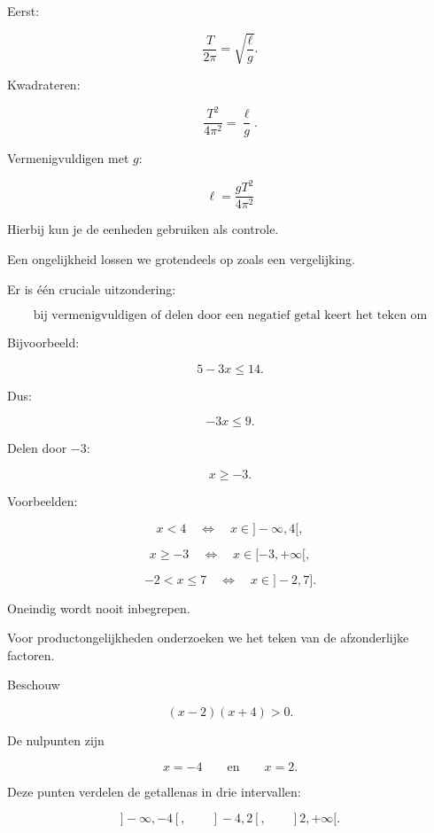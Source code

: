 \documentclass{ximera}
\begin{document}
Eerst:

\[
\frac{T}{2\pi}
=
\sqrt{\frac{\ell}{g}}.
\]

Kwadrateren:

\[
\frac{T^2}{4\pi^2}
=
\frac{\ell}{g}.
\]

Vermenigvuldigen met \(g\):

\[
\boxed{
\ell=\frac{gT^2}{4\pi^2}
}
\]

Hierbij kun je de eenheden gebruiken als controle.




Een ongelijkheid lossen we grotendeels op zoals een vergelijking.

Er is één cruciale uitzondering:

\[
\boxed{
\text{bij vermenigvuldigen of delen door een negatief getal keert het teken om}
}
\]

Bijvoorbeeld:

\[
5-3x\leq14.
\]

Dus:

\[
-3x\leq9.
\]

Delen door \(-3\):

\[
x\geq-3.
\]



Voorbeelden:

\[
x<4
\quad\Longleftrightarrow\quad
x\in]-\infty,4[,
\]

\[
x\geq-3
\quad\Longleftrightarrow\quad
x\in[-3,+\infty[,
\]

\[
-2<x\leq7
\quad\Longleftrightarrow\quad
x\in]-2,7].
\]

Oneindig wordt nooit inbegrepen.



Voor productongelijkheden onderzoeken we het teken van de afzonderlijke factoren.

Beschouw

\[
(x-2)(x+4)>0.
\]

De nulpunten zijn

\[
x=-4
\qquad\text{en}\qquad
x=2.
\]

Deze punten verdelen de getallenas in drie intervallen:

\[
]-\infty,-4[,
\qquad
]-4,2[,
\qquad
]2,+\infty[.
\]
\end{document}

